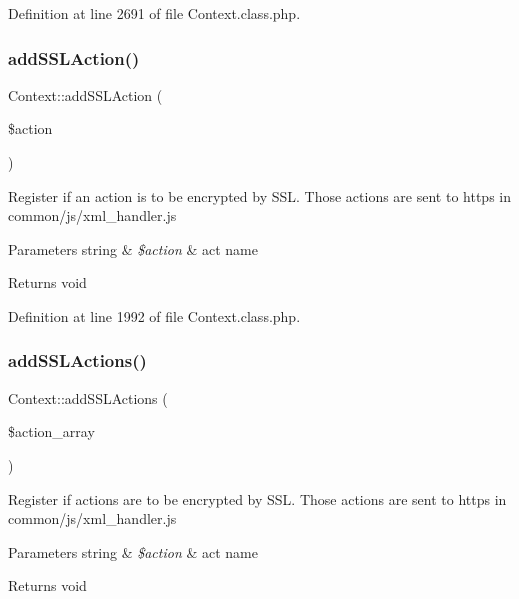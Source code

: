 Definition at line 2691 of file Context.\+class.\+php.

\hypertarget{classContext_a781f5e7a057e6f0992310318a0339ae8}{}\label{classContext_a781f5e7a057e6f0992310318a0339ae8} 
\subsubsection{\texorpdfstring{add\+S\+S\+L\+Action()}{addSSLAction()}}
{\footnotesize\ttfamily Context\+::add\+S\+S\+L\+Action (\begin{DoxyParamCaption}\item[{}]{\$action }\end{DoxyParamCaption})}

Register if an action is to be encrypted by S\+SL. Those actions are sent to https in common/js/xml\+\_\+handler.\+js


\begin{DoxyParams}[1]{Parameters}
string & {\em \$action} & act name \\
\hline
\end{DoxyParams}
\begin{DoxyReturn}{Returns}
void 
\end{DoxyReturn}


Definition at line 1992 of file Context.\+class.\+php.

\hypertarget{classContext_ab2acd5415515b232b7cf9f0130f4efa3}{}\label{classContext_ab2acd5415515b232b7cf9f0130f4efa3} 
\subsubsection{\texorpdfstring{add\+S\+S\+L\+Actions()}{addSSLActions()}}
{\footnotesize\ttfamily Context\+::add\+S\+S\+L\+Actions (\begin{DoxyParamCaption}\item[{}]{\$action\+\_\+array }\end{DoxyParamCaption})}

Register if actions are to be encrypted by S\+SL. Those actions are sent to https in common/js/xml\+\_\+handler.\+js


\begin{DoxyParams}[1]{Parameters}
string & {\em \$action} & act name \\
\hline
\end{DoxyParams}
\begin{DoxyReturn}{Returns}
void 
\end{DoxyReturn}


